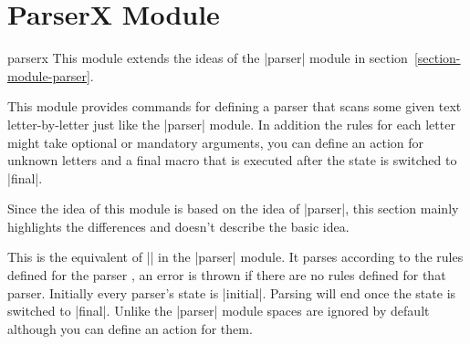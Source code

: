 %
%
%

\section{ParserX Module}
\label{section-module-parserx}

\begin{pgfmodule}{parserx}
  This module extends the ideas of the |parser| module in
  section~\ref{section-module-parser}.
\end{pgfmodule}

This module provides commands for defining a parser that scans some given text
letter-by-letter just like the |parser| module. In addition the rules for each
letter might take optional or mandatory arguments, you can define an action for
unknown letters and a final macro that is executed after the state is
switched to |final|.

Since the idea of this module is based on the idea of |parser|, this section
mainly highlights the differences and doesn't describe the basic idea.

\begin{command}{\pgfparserxrun{}}
  This is the equivalent of |\pgfparserparse| in the |parser| module. It parses
   according to the rules defined for the parser ,
  an error is thrown if there are no rules defined for that parser. Initially
  every parser's state is |initial|. Parsing will end once the state is switched
  to |final|. Unlike the |parser| module spaces are ignored by default although
  you can define an action for them.
\end{command}

